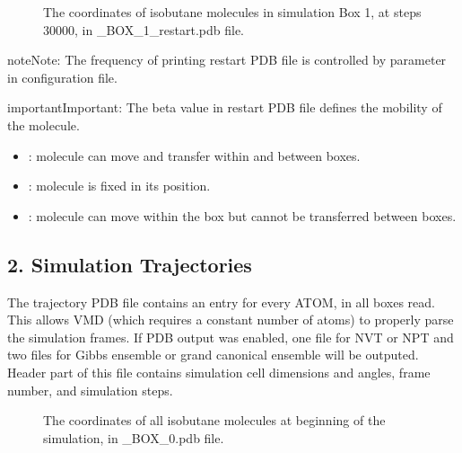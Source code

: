 \documentclass[letterpaper,10pt,english]{sphinxmanual}
\begin{document}
\begin{figure}[htbp]
\centering
\capstart

\noindent{}
\caption{The coordinates of isobutane molecules in simulation Box 1, at steps 30000, in \_BOX\_1\_restart.pdb file.}\label{\detokenize{output_file:id7}}\end{figure}

\begin{sphinxadmonition}{note}{Note:}
The frequency of printing restart PDB file is controlled by 
parameter in configuration file.
\end{sphinxadmonition}

\begin{sphinxadmonition}{important}{Important:}
The beta value in restart PDB file defines the mobility of the molecule.
\begin{itemize}
\item {} 
: molecule can move and transfer within and between boxes.

\item {} 
: molecule is fixed in its position.

\item {} 
: molecule can move within the box but cannot be transferred between boxes.

\end{itemize}
\end{sphinxadmonition}


\subsection{2.  Simulation Trajectories}
\label{\detokenize{output_file:simulation-trajectories}}
The trajectory PDB file contains an entry for every ATOM, in all boxes read. This allows VMD
(which requires a constant number of atoms) to properly parse the simulation frames. If PDB output was enabled,
one file for NVT or NPT and two files for Gibbs ensemble or grand canonical ensemble will be outputed.
Header part of this file contains simulation cell dimensions and angles, frame number, and simulation steps.

\begin{figure}[htbp]
\centering
\capstart

\noindent{}
\caption{The coordinates of all isobutane molecules at beginning of the simulation, in \_BOX\_0.pdb file.}\label{\detokenize{output_file:id8}}\end{figure}
\end{document}
